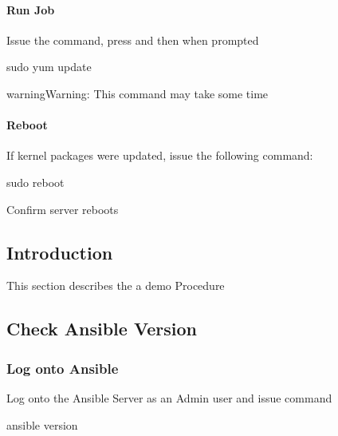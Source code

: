 \documentclass[letterpaper,10pt,english]{sphinxmanual}
\begin{document}
\paragraph{Run Job}
\label{\detokenize{install:run-job}}
\sphinxAtStartPar
Issue the command, press  and then \sphinxcode{\sphinxupquote{{[}ENTER{]}}} when prompted

\begin{sphinxVerbatim}[commandchars=\\\{\}]
sudo yum update
\end{sphinxVerbatim}

\begin{sphinxadmonition}{warning}{Warning:}
\sphinxAtStartPar
This command may take some time
\end{sphinxadmonition}


\paragraph{Reboot}
\label{\detokenize{install:reboot}}
\sphinxAtStartPar
If kernel packages were updated, issue the following command:

\begin{sphinxVerbatim}[commandchars=\\\{\}]
sudo reboot
\end{sphinxVerbatim}

\sphinxAtStartPar
{} Confirm server reboots


\subsection{Introduction}
\label{\detokenize{procedures:introduction}}\label{\detokenize{procedures::doc}}
\sphinxAtStartPar
This section describes the a demo Procedure


\subsection{Check Ansible Version}
\label{\detokenize{procedures:check-ansible-version}}

\subsubsection{Log onto Ansible}
\label{\detokenize{procedures:log-onto-ansible}}
\sphinxAtStartPar
Log onto the Ansible Server as an Admin user and issue command

\begin{sphinxVerbatim}[commandchars=\\\{\}]
ansible \PYGZhy{}\PYGZhy{}version
\end{sphinxVerbatim}
\end{document}
